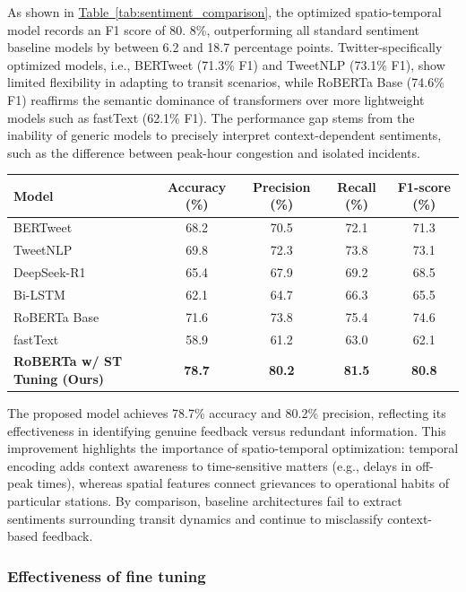 \documentclass[a4paper,fleqn,12pt]{cas-sc}
\begin{document}
As shown in \hyperref[tab:sentiment_comparison]{Table~\ref{tab:sentiment_comparison}}, the optimized spatio-temporal model records an F1 score of 80. 8\%, outperforming all standard sentiment baseline models by between 6.2 and 18.7 percentage points. Twitter-specifically optimized models, i.e., BERTweet (71.3\% F1) and TweetNLP (73.1\% F1), show limited flexibility in adapting to transit scenarios, while RoBERTa Base (74.6\% F1) reaffirms the semantic dominance of transformers over more lightweight models such as fastText (62.1\% F1). The performance gap stems from the inability of generic models to precisely interpret context-dependent sentiments, such as the difference between peak-hour congestion and isolated incidents.


\begin{center}
\label{tab:sentiment_comparison}  
\begin{tabular}{lcccc}  
\toprule  
Model & Accuracy (\%) & Precision (\%) & Recall (\%) & F1-score (\%) \\
\midrule  
BERTweet & 68.2 & 70.5 & 72.1 & 71.3 \\
TweetNLP  & 69.8 & 72.3 & 73.8 & 73.1 \\
DeepSeek-R1 & 65.4 & 67.9 & 69.2 & 68.5 \\
Bi-LSTM  & 62.1 & 64.7 & 66.3 & 65.5 \\
RoBERTa Base  & 71.6 & 73.8 & 75.4 & 74.6 \\
fastText  & 58.9 & 61.2 & 63.0 & 62.1 \\
\textbf{RoBERTa w/ ST Tuning (Ours)} & \textbf{78.7} & \textbf{80.2} & \textbf{81.5} & \textbf{80.8} \\
\bottomrule  
\end{tabular}  
\end{center}

The proposed model achieves 78.7\% accuracy and 80.2\% precision, reflecting its effectiveness in identifying genuine feedback versus redundant information. This improvement highlights the importance of spatio-temporal optimization: temporal encoding adds context awareness to time-sensitive matters (e.g., delays in off-peak times), whereas spatial features connect grievances to operational habits of particular stations. By comparison, baseline architectures fail to extract sentiments surrounding transit dynamics and continue to misclassify context-based feedback.

\subsubsection{Effectiveness of fine tuning}
\end{document}
